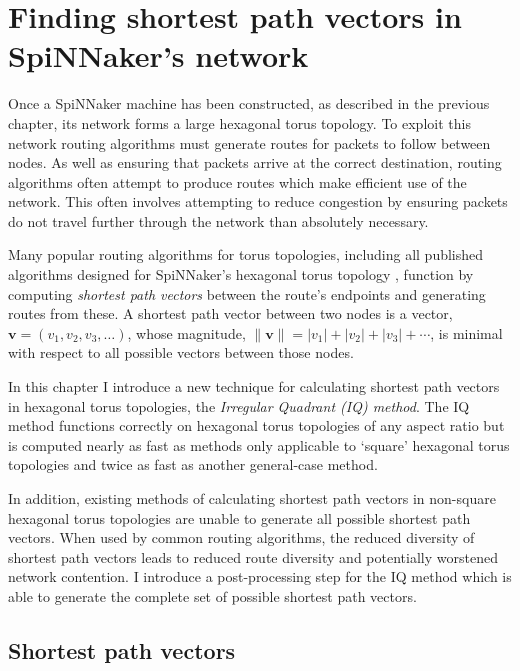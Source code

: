 \chapter{Finding shortest path vectors in SpiNNaker's network}
	
	Once a SpiNNaker machine has been constructed, as described in the previous
	chapter, its network forms a large hexagonal torus topology. To exploit this
	network routing algorithms must generate routes for packets to follow between
	nodes. As well as ensuring that packets arrive at the correct destination,
	routing algorithms often attempt to produce routes which make efficient use
	of the network. This often involves attempting to reduce congestion by
	ensuring packets do not travel further through the network than absolutely
	necessary.
	
	Many popular routing algorithms for torus topologies, including all published
	algorithms designed for SpiNNaker's hexagonal torus topology
	\cite{davies12,navaridas14}, function by computing \emph{shortest path
	vectors} between the route's endpoints and generating routes from these. A
	shortest path vector between two nodes is a vector, $\mathbf{v} = (v_1, v_2,
	v_3, \ldots)$, whose magnitude, $\| \mathbf{v} \| = \lvert v_1 \rvert +
	\lvert v_2 \rvert + \lvert v_3 \rvert + \cdots$, is minimal with respect to
	all possible vectors between those nodes.
	
	In this chapter I introduce a new technique for calculating shortest path
	vectors in hexagonal torus topologies, the \emph{Irregular Quadrant (IQ)
	method}. The IQ method functions correctly on hexagonal torus topologies of
	any aspect ratio but is computed nearly as fast as methods only applicable to
	`square' hexagonal torus topologies and twice as fast as another general-case
	method.
	
	In addition, existing methods of calculating shortest path vectors in
	non-square hexagonal torus topologies are unable to generate all possible
	shortest path vectors. When used by common routing algorithms, the reduced
	diversity of shortest path vectors leads to reduced route diversity and
	potentially worstened network contention. I introduce a post-processing step
	for the IQ method which is able to generate the complete set of possible
	shortest path vectors.
	
	\section{Shortest path vectors}
		
